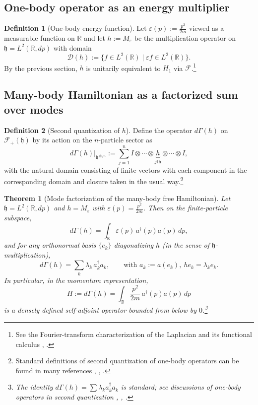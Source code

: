 \documentclass[11pt]{article}
\theoremstyle{definition}
\newtheorem{definition}{Definition}
\theoremstyle{plain}
\newtheorem{theorem}{Theorem}
\numberwithin{equation}{section}
\begin{document}
\subsection{One-body operator as an energy multiplier}

\begin{definition}[One-body energy function]
Let $\varepsilon(p):=\frac{p^2}{2m}$ viewed as a measurable function on $\mathbb{R}$ and let $h:=M_{\varepsilon}$ be the multiplication operator on $\mathfrak{h}=L^2(\mathbb{R},dp)$ with domain
\[
\mathcal{D}(h):=\{f\in L^2(\mathbb{R}) \mid \varepsilon f\in L^2(\mathbb{R})\}.
\]
By the previous section, $h$ is unitarily equivalent to $H_1$ via $\mathcal{F}$.\footnote{See the Fourier-transform characterization of the Laplacian and its functional calculus \cite[Sec.~1.6]{kowalskispectral}, \cite[pp.~3--4]{feldmanlaplacian}.}
\end{definition}

\subsection{Many-body Hamiltonian as a factorized sum over modes}

\begin{definition}[Second quantization of $h$]
Define the operator $d\Gamma(h)$ on $\mathcal{F}_+(\mathfrak{h})$ by its action on the $n$-particle sector as
\[
d\Gamma(h)\big|_{\mathfrak{h}^{\otimes_s n}}:=\sum_{j=1}^n I\otimes\cdots\otimes \underbrace{h}_{j\text{th}}\otimes\cdots\otimes I,
\]
with the natural domain consisting of finite vectors with each component in the corresponding domain and closure taken in the usual way.\footnote{Standard definitions of second quantization of one-body operators can be found in many references \cite[Sec.~1.4]{uiuc561}, \cite[Sec.~3]{usp-3}, \cite{scholarpedia}.}
\end{definition}

\begin{theorem}[Mode factorization of the many-body free Hamiltonian]
Let $\mathfrak{h}=L^2(\mathbb{R},dp)$ and $h=M_{\varepsilon}$ with $\varepsilon(p)=\frac{p^2}{2m}$. Then on the finite-particle subspace,
\[
d\Gamma(h)=\int_{\mathbb{R}}\varepsilon(p)\,a^\dagger(p)a(p)\,dp,
\]
and for any orthonormal basis $\{e_k\}$ diagonalizing $h$ (in the sense of $\mathfrak{h}$-multiplication),
\[
d\Gamma(h)=\sum_k \lambda_k\, a_k^\dagger a_k,\qquad \text{with } a_k:=a(e_k),\ h e_k=\lambda_k e_k.
\]
In particular, in the momentum representation,
\[
H:=d\Gamma(h)=\int_{\mathbb{R}}\frac{p^2}{2m}\,a^\dagger(p)a(p)\,dp
\]
is a densely defined self-adjoint operator bounded from below by $0$.\footnote{The identity $d\Gamma(h)=\sum \lambda_k a_k^\dagger a_k$ is standard; see discussions of one-body operators in second quantization \cite[Sec.~1.4]{uiuc561}, \cite[Sec.~3]{usp-3}, \cite{scholarpedia}.}
\end{theorem}
\end{document}
